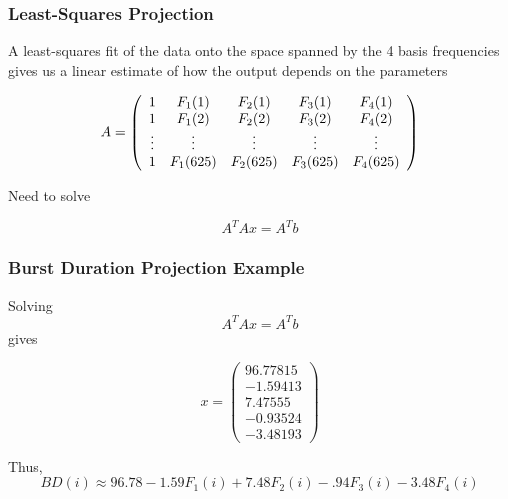\documentclass{beamer}
\theoremstyle{plain}
\theoremstyle{definition}
\begin{document}
\begin{frame}\frametitle{Least-Squares Projection}
  A least-squares fit of the data onto the space spanned by the 4 basis frequencies gives us a linear estimate of how the output depends on the parameters

  $$A = \left( \begin{array}{c c c c c}
                                       1 & F_1(1) & F_2(1) & F_3(1) & F_4(1)\\
                                       1 & F_1(2) & F_2(2) & F_3(2) & F_4(2)\\
                                       \vdots & \vdots & \vdots & \vdots & \vdots\\
                                       1 & F_1(625) & F_2(625) & F_3(625) & F_4(625)
                                      \end{array} \right)$$

  \vspace{1em}
  Need to solve

  $$A^TAx = A^Tb$$

\end{frame}

\begin{frame}\frametitle{Burst Duration Projection Example}
  Solving $$A^TAx = A^Tb$$ gives

  $$x =    \left( \begin{array}{c}
          96.77815\\
          -1.59413\\
          7.47555\\
          -0.93524\\
          -3.48193
         \end{array} \right)$$

  Thus, $$BD(i) \approx 96.78 - 1.59F_1(i) + 7.48F_2(i) - .94F_3(i) - 3.48F_4(i)$$
\end{frame}
\end{document}
